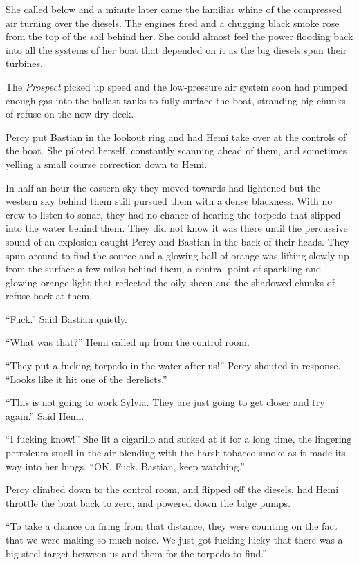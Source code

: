 \documentclass[]{scrbook}
\begin{document}
She called below and a minute later came the familiar whine of the
compressed air turning over the diesels. The engines fired and a
chugging black smoke rose from the top of the sail behind her. She could
almost feel the power flooding back into all the systems of her boat
that depended on it as the big diesels spun their turbines.

The \emph{Prospect} picked up speed and the low-pressure air system soon
had pumped enough gas into the ballast tanks to fully surface the boat,
stranding big chunks of refuse on the now-dry deck.

Percy put Bastian in the lookout ring and had Hemi take over at the
controls of the boat. She piloted herself, constantly scanning ahead of
them, and sometimes yelling a small course correction down to Hemi.

In half an hour the eastern sky they moved towards had lightened but the
western sky behind them still pursued them with a dense blackness. With
no crew to listen to sonar, they had no chance of hearing the torpedo
that slipped into the water behind them. They did not know it was there
until the percussive sound of an explosion caught Percy and Bastian in
the back of their heads. They spun around to find the source and a
glowing ball of orange was lifting slowly up from the surface a few
miles behind them, a central point of sparkling and glowing orange light
that reflected the oily sheen and the shadowed chunks of refuse back at
them.

``Fuck.'' Said Bastian quietly.

``What was that?'' Hemi called up from the control room.

``They put a fucking torpedo in the water after us!'' Percy shouted in
response. ``Looks like it hit one of the derelicts.''

``This is not going to work Sylvia. They are just going to get closer
and try again.'' Said Hemi.

``I fucking know!'' She lit a cigarillo and sucked at it for a long
time, the lingering petroleum smell in the air blending with the harsh
tobacco smoke as it made its way into her lungs. ``OK. Fuck. Bastian,
keep watching.''

Percy climbed down to the control room, and flipped off the diesels, had
Hemi throttle the boat back to zero, and powered down the bilge pumps.

``To take a chance on firing from that distance, they were counting on
the fact that we were making so much noise. We just got fucking lucky
that there was a big steel target between us and them for the torpedo to
find.''
\end{document}
